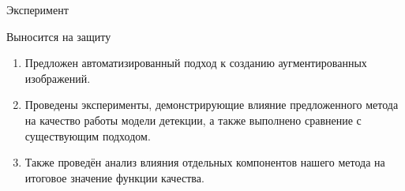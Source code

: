 \documentclass{beamer}
\begin{document}
\begin{frame}{Эксперимент}

\begin{table}[ht]
\label{tab:map_comparison}
\centering
{}
\caption{Сравнение показателей mAP для модели детекции YOLO, обученной в течение 500 эпох, с порогом фильтрации аугментаций 0.2.}
\end{table}

\begin{table}[ht]
\label{tab:map_comparison}
\centering
{}
\caption{Сравнение показателей mAP для модели детекции YOLO, обученной в течение 500 эпох, с порогом фильтрации аугментаций 0.23.}
\end{table}



\end{frame}
\begin{frame}{Выносится на защиту}

\begin{enumerate}
    \item Предложен автоматизированный подход к созданию аугментированных изображений.
    \item Проведены эксперименты, демонстрирующие влияние предложенного метода на качество работы модели детекции, а также выполнено сравнение с существующим подходом.
    \item Также проведён анализ влияния отдельных компонентов нашего метода на итоговое значение функции качества.
\end{enumerate}


\end{frame}
\end{document}
